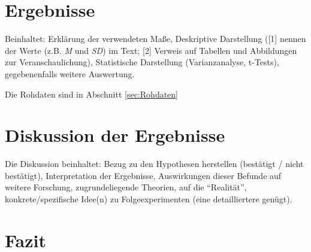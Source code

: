\documentclass[11pt,a4paper,ngerman]{article}
\begin{document}
\section{Ergebnisse}
Beinhaltet: Erklärung der verwendeten Maße, Deskriptive Darstellung ([1] nennen der Werte (z.B. \textit{M} und \textit{SD}) im Text; [2] Verweis auf Tabellen und Abbildungen zur Veranschaulichung), Statistische Darstellung (Varianzanalyse, t-Tests), gegebenenfalls weitere Auswertung.

Die Rohdaten sind in Abschnitt \ref{sec:Rohdaten}


\section{Diskussion der Ergebnisse}
Die Diskussion beinhaltet: Bezug zu den Hypothesen herstellen (bestätigt / nicht bestätigt), Interpretation der Ergebnisse, Auswirkungen dieser Befunde auf weitere Forschung, zugrundeliegende Theorien, auf die "`Realität"', konkrete/spezifische Idee(n) zu Folgeexperimenten (eine detailliertere genügt).

\section{Fazit}

\end{document}
